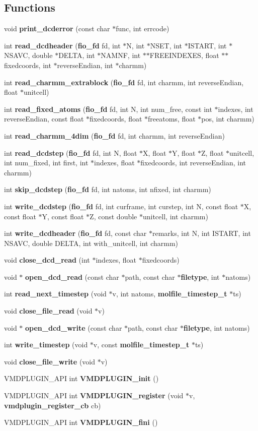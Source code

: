\subsection*{Functions}
\begin{CompactItemize}
\item 
void {\bf print\_\-dcderror} (const char $\ast$func, int errcode)
\item 
int {\bf read\_\-dcdheader} ({\bf fio\_\-fd} fd, int $\ast$N, int $\ast$NSET, int $\ast$ISTART, int $\ast$NSAVC, double $\ast$DELTA, int $\ast$NAMNF, int $\ast$$\ast$FREEINDEXES, float $\ast$$\ast$fixedcoords, int $\ast$reverse\-Endian, int $\ast$charmm)
\item 
int {\bf read\_\-charmm\_\-extrablock} ({\bf fio\_\-fd} fd, int charmm, int reverse\-Endian, float $\ast$unitcell)
\item 
int {\bf read\_\-fixed\_\-atoms} ({\bf fio\_\-fd} fd, int N, int num\_\-free, const int $\ast$indexes, int reverse\-Endian, const float $\ast$fixedcoords, float $\ast$freeatoms, float $\ast$pos, int charmm)
\item 
int {\bf read\_\-charmm\_\-4dim} ({\bf fio\_\-fd} fd, int charmm, int reverse\-Endian)
\item 
int {\bf read\_\-dcdstep} ({\bf fio\_\-fd} fd, int N, float $\ast$X, float $\ast$Y, float $\ast$Z, float $\ast$unitcell, int num\_\-fixed, int first, int $\ast$indexes, float $\ast$fixedcoords, int reverse\-Endian, int charmm)
\item 
int {\bf skip\_\-dcdstep} ({\bf fio\_\-fd} fd, int natoms, int nfixed, int charmm)
\item 
int {\bf write\_\-dcdstep} ({\bf fio\_\-fd} fd, int curframe, int curstep, int N, const float $\ast$X, const float $\ast$Y, const float $\ast$Z, const double $\ast$unitcell, int charmm)
\item 
int {\bf write\_\-dcdheader} ({\bf fio\_\-fd} fd, const char $\ast$remarks, int N, int ISTART, int NSAVC, double DELTA, int with\_\-unitcell, int charmm)
\item 
void {\bf close\_\-dcd\_\-read} (int $\ast$indexes, float $\ast$fixedcoords)
\item 
void $\ast$ {\bf open\_\-dcd\_\-read} (const char $\ast$path, const char $\ast${\bf filetype}, int $\ast$natoms)
\item 
int {\bf read\_\-next\_\-timestep} (void $\ast$v, int natoms, {\bf molfile\_\-timestep\_\-t} $\ast$ts)
\item 
void {\bf close\_\-file\_\-read} (void $\ast$v)
\item 
void $\ast$ {\bf open\_\-dcd\_\-write} (const char $\ast$path, const char $\ast${\bf filetype}, int natoms)
\item 
int {\bf write\_\-timestep} (void $\ast$v, const {\bf molfile\_\-timestep\_\-t} $\ast$ts)
\item 
void {\bf close\_\-file\_\-write} (void $\ast$v)
\item 
VMDPLUGIN\_\-API int {\bf VMDPLUGIN\_\-init} ()
\item 
VMDPLUGIN\_\-API int {\bf VMDPLUGIN\_\-register} (void $\ast$v, {\bf vmdplugin\_\-register\_\-cb} cb)
\item 
VMDPLUGIN\_\-API int {\bf VMDPLUGIN\_\-fini} ()
\end{CompactItemize}
